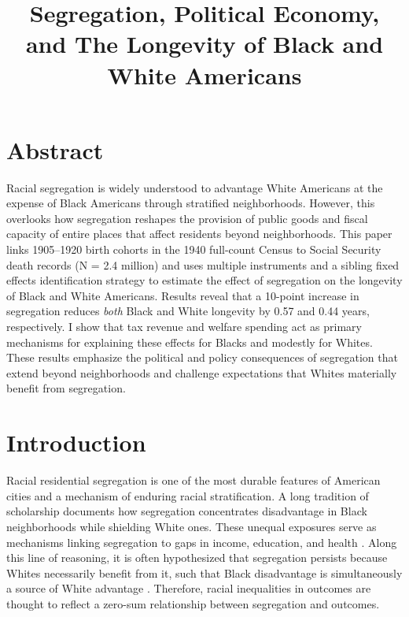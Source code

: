 \documentclass[11pt]{article}
\title{Segregation, Political Economy, and The Longevity of Black and White Americans}
\begin{document}
\maketitle

\section{Abstract}

Racial segregation is widely understood to advantage White Americans at the expense of Black Americans through stratified neighborhoods. However, this overlooks how segregation reshapes the provision of public goods and fiscal capacity of entire places that affect residents beyond neighborhoods. This paper links 1905--1920 birth cohorts in the 1940 full-count Census to Social Security death records (N = 2.4 million) and uses multiple instruments and a sibling fixed effects identification strategy to estimate the effect of segregation on the longevity of Black and White Americans. Results reveal that a 10-point increase in segregation reduces \textit{both} Black and White longevity by 0.57 and 0.44 years, respectively. I show that tax revenue and welfare spending act as primary mechanisms for explaining these effects for Blacks and modestly for Whites. These results emphasize the political and policy consequences of segregation that extend beyond neighborhoods and challenge expectations that Whites materially benefit from segregation.  
\pagebreak
\section{Introduction}
\doublespacing

Racial residential segregation is one of the most durable features of American cities and a mechanism of enduring racial stratification. A long tradition of scholarship documents how segregation concentrates disadvantage in Black neighborhoods while shielding White ones. These unequal exposures serve as mechanisms linking segregation to gaps in income, education, and health \citep{massey_american_1993,massey_effect_1987,williams_racial_2001}. Along this line of reasoning, it is often hypothesized that segregation persists because Whites necessarily benefit from it, such that Black disadvantage is simultaneously a source of White advantage \citep{massey_getting_1995}. Therefore, racial inequalities in outcomes are thought to reflect a zero-sum relationship between segregation and outcomes.
\end{document}
